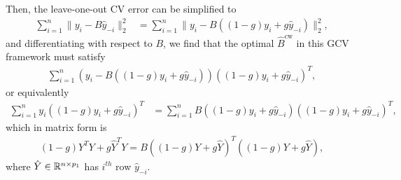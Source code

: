 \documentclass{article}
\begin{document}
Then, the leave-one-out CV error can be simplified to
\begin{align*}
  \sum_{i = 1}^{n}\|y_{i} - B\hat{y}_{-i}\|_{2}^{2} &= \sum_{i =
    1}^{n} \|y_{i} - B\left(\left(1 - g\right)y_{i} +
    g\hat{y}_{-i}\right)\|_{2}^{2},
\end{align*}
and differentiating with respect to $B$, we find that the optimal
$\hat{B}^{\text{cw}}$ in this GCV framework must satisfy
\begin{align*}
\sum_{i = 1}^{n}\left(y_{i} - B\left(\left(1 - g\right)y_{i} +
    g\hat{y}_{-i}\right)\right)\left(\left(1 - g\right)y_{i} +
  g\hat{y}_{-i}\right)^{T},
\end{align*}
or equivalently
\begin{align*}
\sum_{i = 1}^{n} y_{i}\left(\left(1 - g\right)y_{i} +
  g\hat{y}_{-i}\right)^{T} &=  \sum_{i = 1}^{n}B\left(\left(1 -
    g\right)y_{i} + g\hat{y}_{-i}\right)\left(\left(1 - g\right)y_{i}
  +  g\hat{y}_{-i}\right)^{T},
\end{align*}
which in matrix form is
\begin{align}
\left(1 - g\right)Y^{T}Y + g\hat{Y}^{T}Y = B\left(\left(1 - g\right)Y
  + g \hat{Y}\right)^{T}\left(\left(1 - g\right)Y + g \hat{Y}\right), \label{eq:gcv_mat_form}
\end{align}
where $\hat{Y} \in \mathbb{R}^{n \times p_{1}}$ has $i^{th}$ row
$\hat{y}_{-i}$.
\end{document}
